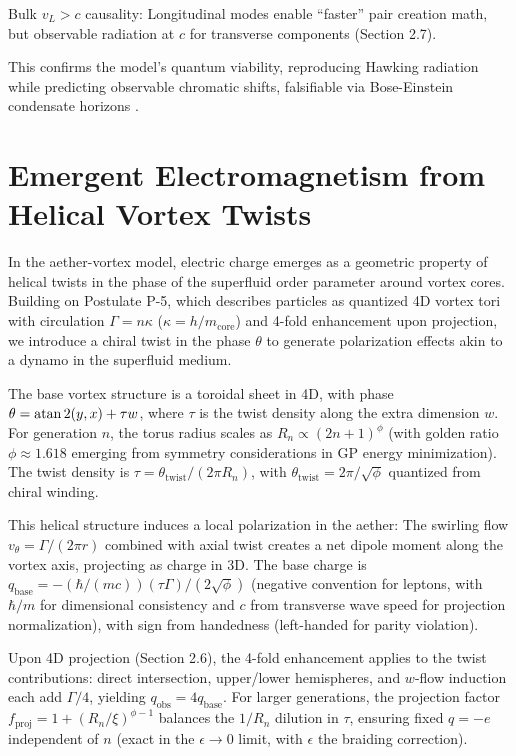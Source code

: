 \documentclass{article}
\begin{document}
Bulk $v_L > c$ causality: Longitudinal modes enable ``faster'' pair creation math, but observable radiation at $c$ for transverse components (Section 2.7).

This confirms the model's quantum viability, reproducing Hawking radiation while predicting observable chromatic shifts, falsifiable via Bose-Einstein condensate horizons \cite{steinhauer2016observation}.

\section{Emergent Electromagnetism from Helical Vortex Twists}

In the aether-vortex model, electric charge emerges as a geometric property of helical twists in the phase of the superfluid order parameter around vortex cores. Building on Postulate P-5, which describes particles as quantized 4D vortex tori with circulation $\Gamma = n \kappa$ ($\kappa = h / m_{\text{core}}$) and 4-fold enhancement upon projection, we introduce a chiral twist in the phase $\theta$ to generate polarization effects akin to a dynamo in the superfluid medium.

The base vortex structure is a toroidal sheet in 4D, with phase $\theta = \atan2(y, x) + \tau w$, where $\tau$ is the twist density along the extra dimension $w$. For generation $n$, the torus radius scales as $R_n \propto (2n+1)^\phi$ (with golden ratio $\phi \approx 1.618$ emerging from symmetry considerations in GP energy minimization). The twist density is $\tau = \theta_{\text{twist}} / (2\pi R_n)$, with $\theta_{\text{twist}} = 2\pi / \sqrt{\phi}$ quantized from chiral winding.

This helical structure induces a local polarization in the aether: The swirling flow $v_{\theta} = \Gamma / (2\pi r)$ combined with axial twist creates a net dipole moment along the vortex axis, projecting as charge in 3D. The base charge is $q_{\text{base}} = - (\hbar / (m c)) (\tau \Gamma) / (2 \sqrt{\phi})$ (negative convention for leptons, with $\hbar / m$ for dimensional consistency and $c$ from transverse wave speed for projection normalization), with sign from handedness (left-handed for parity violation).

Upon 4D projection (Section 2.6), the 4-fold enhancement applies to the twist contributions: direct intersection, upper/lower hemispheres, and $w$-flow induction each add $\Gamma/4$, yielding $q_{\text{obs}} = 4 q_{\text{base}}$. For larger generations, the projection factor $f_{\text{proj}} = 1 + (R_n / \xi)^{\phi - 1}$ balances the $1/R_n$ dilution in $\tau$, ensuring fixed $q = -e$ independent of $n$ (exact in the $\epsilon \to 0$ limit, with $\epsilon$ the braiding correction).
\end{document}
